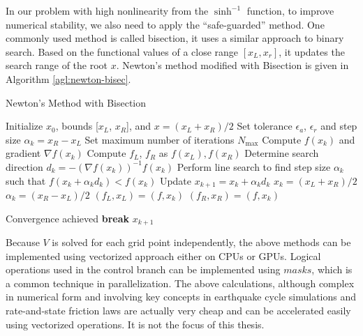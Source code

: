 In our problem with high nonlinearity from the $\sinh^{-1}$ function, to improve numerical stability, we also need to apply the ``safe-guarded'' method.
One commonly used method is called bisection, it uses a similar approach to binary search. 
Based on the functional values of a close range $[x_L, x_r]$, it updates the search range of the root $x$.
Newton's method modified with Bisection is given in Algorithm \autoref{agl:newton-bisec}.

\begin{algorithm}
\caption{Newton's Method with Bisection}
\begin{algorithmic}[1]
\State Initialize $x_0$, bounds [$x_L$, $x_R$], and $x = (x_L + x_R) / 2$
\State Set tolerance $\epsilon_a$, $\epsilon_r$ and step size $\alpha_k = x_R - x_L$
\State Set maximum number of iterations $N_{\max}$
    \State Compute $f(x_k)$ and gradient $\nabla f(x_k)$
    \State Compute $f_L$, $f_R$ as $f(x_L), f(x_R)$  
    \State Determine search direction $d_k = -(\nabla f(x_k))^{-1} f(x_k)$
    \State Perform line search to find step size $\alpha_k$ such that $f(x_k + \alpha_k d_k) < f(x_k)$
    \State Update $x_{k+1} = x_k + \alpha_k d_k$
        \State $x_k = (x_L + x_R) / 2$
        \State $\alpha_k = (x_R - x_L) / 2$
    \EndIf
        \State $(f_L, x_L) = (f, x_k)$
    \Else
        \State $(f_R, x_R) = (f, x_k)$
    \EndIf
    
    
        \State Convergence achieved
        \State \textbf{break}
    \EndIf
\EndFor
\Return $x_{k+1}$
\end{algorithmic}
\label{agl:newton-bisec}
\end{algorithm}

Because $V$ is solved for each grid point independently, the above methods can be implemented using vectorized approach either on CPUs or GPUs.
Logical operations used in the control branch can be implemented using $masks$, which is a common technique in parallelization. 
The above calculations, although complex in numerical form and involving key concepts in earthquake cycle simulations and rate-and-state friction laws are actually very cheap and can be accelerated easily using vectorized operations. It is not the focus of this thesis.

